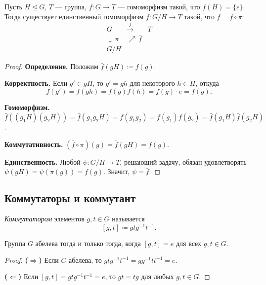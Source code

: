 \begin{stmt}
    Пусть $H \trianglelefteq G$, $T$ --- группа, $f\colon G \to T$ --- гомоморфизм такой, что $f(H) = \{e\}$.
    Тогда существует единственный гомоморфизм $\bar{f}\colon G/H \to T$ такой, что $f = \bar{f} \circ \pi$:
    \[
        \begin{array}{ccc}
            G & \xrightarrow{\ f\ } & T \\
            \downarrow\, \pi & \nearrow\, \bar{f} & \\
            G/H & &
        \end{array}
    \]

    \begin{proof}
        \textbf{Определение.} Положим $\bar{f}(gH) \coloneqq f(g)$.

        \textbf{Корректность.} Если $g' \in gH$, то $g' = gh$ для некоторого $h \in H$, откуда
        \[
            f(g') = f(gh) = f(g) f(h) = f(g) \cdot e = f(g).
        \]

        \textbf{Гомоморфизм.} $\bar{f}((g_1 H)(g_2 H)) = \bar{f}(g_1 g_2 H) = f(g_1 g_2) = f(g_1) f(g_2) = \bar{f}(g_1 H)\bar{f}(g_2 H)$.

        \textbf{Коммутативность.} $(\bar{f} \circ \pi)(g) = \bar{f}(gH) = f(g)$.

        \textbf{Единственность.} Любой $\psi\colon G/H \to T$, решающий задачу, обязан удовлетворять
        $\psi(gH) = \psi(\pi(g)) = f(g)$. Значит, $\psi = \bar{f}$.
    \end{proof}
\end{stmt}

\subsection*{Коммутаторы и коммутант}

\begin{definition}
    \emph{Коммутатором} элементов $g, t \in G$ называется
    \[
        [g, t] \coloneqq g t g^{-1} t^{-1}.
    \]
\end{definition}

\begin{stmt}
    Группа $G$ абелева тогда и только тогда, когда $[g, t] = e$ для всех $g, t \in G$.

    \begin{proof}
        \textbf{($\Rightarrow$)} Если $G$ абелева, то $gtg^{-1}t^{-1} = gg^{-1}tt^{-1} = e$.

        \textbf{($\Leftarrow$)} Если $[g, t] = gtg^{-1}t^{-1} = e$, то $gt = tg$ для любых $g, t \in G$.
    \end{proof}
\end{stmt}

